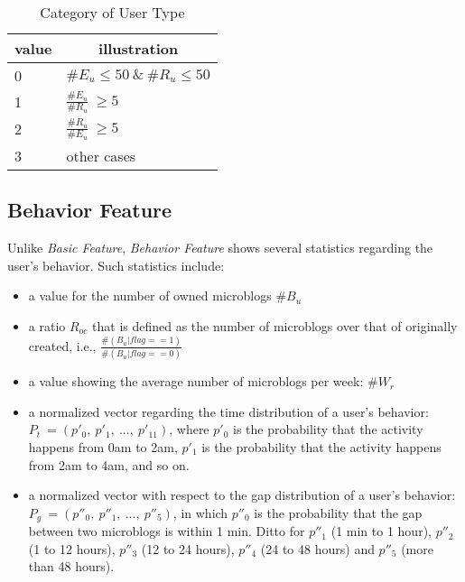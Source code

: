 

\begin{table}[!htb]
\centering
\begin{small}
\caption{Category of User Type}
\vspace{0.3cm}
\label{tbl:ucate}
\begin{tabular}{ll}
\toprule
\multicolumn{1}{c}{\textbf{value}} & \multicolumn{1}{c}{\textbf{illustration}}	\\	\midrule \midrule
0                       & $\#E_u \le 50 \ \& \ \#R_u \le 50$				\\	\midrule
\multirow{2}{*}{1}      & \multirow{2}{*}{$\frac{\#E_u}{\#R_u} \ \ge 5$}	\\
 						&                       									\\	\midrule
\multirow{2}{*}{2}		& \multirow{2}{*}{$\frac{\#R_u}{\#E_u} \ \ge 5$}  \\
						&															\\	\midrule
3                   	& other cases 												\\ \bottomrule
\end{tabular}
\end{small}
\end{table}


\subsection{Behavior Feature}

Unlike \textit{Basic Feature}, \textit{Behavior Feature} shows several statistics regarding the user's \retg{} behavior.
Such statistics include:
\begin{itemize}
	\item a value for the number of owned microblogs $\#B_u$
	\item a ratio $R_{oc}$ that is defined as the number of \retd{} microblogs over that of originally created, i.e., $\frac{\#(B_u | flag ==1)}{\#(B_u | flag ==0)}$
	\item a value showing the average number of \retd{} microblogs per week: $\#W_r$
	\item a normalized vector regarding the time distribution of a user's \retg{} behavior: $P_t\ = (p'_0,\ p'_1,\ ...,\ p'_{11})$, where $p'_0$ is the probability that the \retg{} activity happens from 0am to 2am, $p'_1$ is the probability that the \retg{} activity happens from 2am to 4am, and so on.
	\item a normalized vector with respect to the gap distribution of a user's \retg{} behavior: $P_g\ = (p''_0,\ p''_1,\ ...,\ p''_{5})$, in which $p''_0$ is the probability that the gap between two \retd{} microblogs is within 1 min. Ditto for $p''_1$ (1 min to 1 hour), $p''_2$ (1 to 12 hours), $p''_3$ (12 to 24 hours), $p''_4$ (24 to 48 hours) and  $p''_5$ (more than 48 hours).
\end{itemize}

